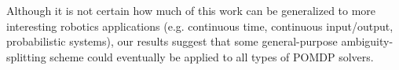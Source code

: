Although it is not certain how much of this work can be generalized to more
interesting robotics applications (e.g. continuous time, continuous input/output,
probabilistic systems), our results suggest that some general-purpose
ambiguity-splitting scheme could eventually be applied to all types of POMDP solvers.
\begin{figure}
\centering
{}\qquad
{}\\
\qquad
{}\\

\end{figure}
